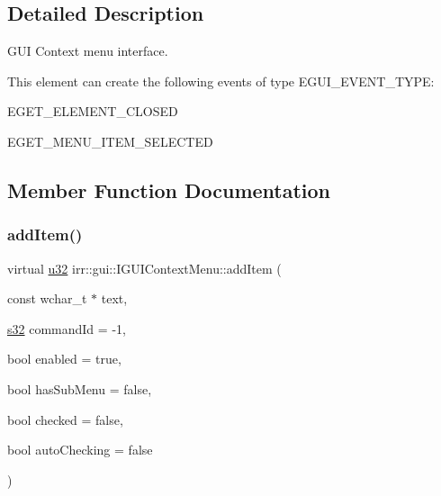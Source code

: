 \subsection{Detailed Description}
G\+UI Context menu interface. 

\begin{DoxyParagraph}{This element can create the following events of type E\+G\+U\+I\+\_\+\+E\+V\+E\+N\+T\+\_\+\+T\+Y\+PE\+:}
\begin{DoxyItemize}
\item E\+G\+E\+T\+\_\+\+E\+L\+E\+M\+E\+N\+T\+\_\+\+C\+L\+O\+S\+ED \item E\+G\+E\+T\+\_\+\+M\+E\+N\+U\+\_\+\+I\+T\+E\+M\+\_\+\+S\+E\+L\+E\+C\+T\+ED \end{DoxyItemize}

\end{DoxyParagraph}


\subsection{Member Function Documentation}
\mbox{\label{classirr_1_1gui_1_1IGUIContextMenu_afa25240cb37816c3f8941ccc0f2c14ea}} 
\subsubsection{\texorpdfstring{add\+Item()}{addItem()}}
{\footnotesize\ttfamily virtual \hyperlink{namespaceirr_a0416a53257075833e7002efd0a18e804}{u32} irr\+::gui\+::\+I\+G\+U\+I\+Context\+Menu\+::add\+Item (\begin{DoxyParamCaption}\item[{const wchar\+\_\+t $\ast$}]{text,  }\item[{\hyperlink{namespaceirr_ac66849b7a6ed16e30ebede579f9b47c6}{s32}}]{command\+Id = {\ttfamily -\/1},  }\item[{bool}]{enabled = {\ttfamily true},  }\item[{bool}]{has\+Sub\+Menu = {\ttfamily false},  }\item[{bool}]{checked = {\ttfamily false},  }\item[{bool}]{auto\+Checking = {\ttfamily false} }\end{DoxyParamCaption})\hspace{0.3cm}{\ttfamily [pure virtual]}}



